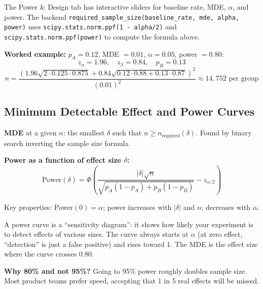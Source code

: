 \documentclass[11pt,a4paper]{article}
\newcommand{\code}[1]{\texttt{#1}}
\newcommand{\scipy}[1]{\texttt{scipy.stats.#1}}
\begin{document}
\vspace{8pt}

\begin{application}
The Power \& Design tab has interactive sliders for baseline rate, MDE, $\alpha$, and power. The backend \code{required\_sample\_size(baseline\_rate, mde, alpha, power)} uses \scipy{norm.ppf(1 - alpha/2)} and \scipy{norm.ppf(power)} to compute the formula above.

\medskip
\textbf{Worked example:} $p_A = 0.12$, MDE $= 0.01$, $\alpha = 0.05$, power $= 0.80$:
\[
z_\alpha = 1.96, \quad z_\beta = 0.84, \quad p_B = 0.13
\]
\[
n = \frac{(1.96\sqrt{2 \cdot 0.125 \cdot 0.875} + 0.84\sqrt{0.12 \cdot 0.88 + 0.13 \cdot 0.87})^2}{(0.01)^2} \approx 14{,}752 \text{ per group}
\]
\end{application}

\subsection{Minimum Detectable Effect and Power Curves}

\begin{formaldef}
\textbf{MDE} at a given $n$: the smallest $\delta$ such that $n \geq n_{\mathrm{required}}(\delta)$. Found by binary search inverting the sample size formula.

\medskip
\textbf{Power as a function of effect size $\delta$:}
\[
\mathrm{Power}(\delta) = \Phi\!\left(\frac{|\delta|\sqrt{n}}{\sqrt{p_A(1-p_A) + p_B(1-p_B)}} - z_{\alpha/2}\right)
\]

Key properties: Power$(0) = \alpha$; power increases with $|\delta|$ and $n$; decreases with $\alpha$.
\end{formaldef}

\vspace{8pt}

\begin{intuition}
A power curve is a ``sensitivity diagram'': it shows how likely your experiment is to detect effects of various sizes. The curve always starts at $\alpha$ (at zero effect, ``detection'' is just a false positive) and rises toward 1. The MDE is the effect size where the curve crosses 0.80.

\textbf{Why 80\% and not 95\%?} Going to 95\% power roughly doubles sample size. Most product teams prefer speed, accepting that 1 in 5 real effects will be missed.
\end{intuition}
\end{document}
